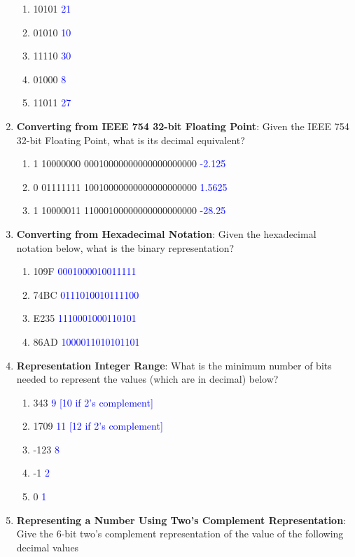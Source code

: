 \documentclass{article}
\begin{document}
\begin{enumerate}[label=(\alph*)]
\begin{enumerate}[label=(\roman*)]
        \item 10101 \textcolor{blue}{21}
        \item 01010 \textcolor{blue}{10}
        \item 11110 \textcolor{blue}{30}
        \item 01000 \textcolor{blue}{8}
        \item 11011 \textcolor{blue}{27}
    \end{enumerate}
    \item \textbf{Converting from IEEE 754 32-bit Floating Point}: Given the IEEE 754 32-bit Floating Point, what is its decimal equivalent?
    \begin{enumerate}[label=(\roman*)]
        \item 1 10000000 00010000000000000000000 \textcolor{blue}{-2.125}
        \item 0 01111111 10010000000000000000000 \textcolor{blue}{1.5625}
        \item 1 10000011 11000100000000000000000 \textcolor{blue}{-28.25}
    \end{enumerate}
    \newpage
    \item \textbf{Converting from Hexadecimal Notation}: Given the hexadecimal notation below, what is the binary representation?
    \begin{enumerate}[label=(\roman*)]
        \item 109F \textcolor{blue}{0001000010011111}
        \item 74BC \textcolor{blue}{0111010010111100}
        \item E235 \textcolor{blue}{1110001000110101}
        \item 86AD \textcolor{blue}{1000011010101101}
    \end{enumerate}
    \item \textbf{Representation Integer Range}: What is the minimum number of bits needed to represent the values (which are in decimal) below?
    \begin{enumerate}[label=(\roman*)]
        \item 343 \textcolor{blue}{9 [10 if 2’s complement]}
        \item 1709 \textcolor{blue}{11 [12 if 2’s complement]}
        \item -123 \textcolor{blue}{8}
        \item -1 \textcolor{blue}{2}
        \item 0 \textcolor{blue}{1}
    \end{enumerate}
    \item \textbf{Representing a Number Using Two's Complement Representation}: Give the 6-bit two's complement representation of the value of the following decimal values

\end{enumerate}
\end{document}
